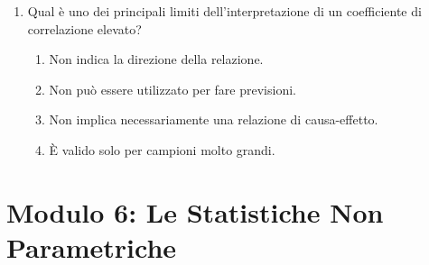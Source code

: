 \documentclass[12pt, a4paper]{article}
\begin{document}
\begin{enumerate}[resume]
    \item Qual è uno dei principali limiti dell'interpretazione di un coefficiente di correlazione elevato?
    \begin{enumerate}
        \item Non indica la direzione della relazione.
        \item Non può essere utilizzato per fare previsioni.
        \item Non implica necessariamente una relazione di causa-effetto.
        \item È valido solo per campioni molto grandi.
    \end{enumerate}
    \vspace{0.3cm}
\end{enumerate}

\section*{Modulo 6: Le Statistiche Non Parametriche}
\end{document}
